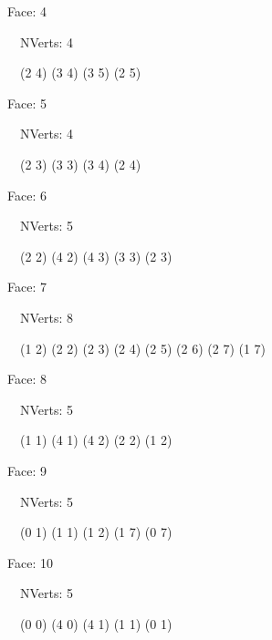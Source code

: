 \documentclass{article}
\begin{document}
    {\footnotesize

    Face: 4

    \   \    NVerts: 4

     \   \   (2 4) (3 4) (3 5) (2 5)}

    {\footnotesize

    Face: 5

    \   \    NVerts: 4

     \   \   (2 3) (3 3) (3 4) (2 4)}

    {\footnotesize

    Face: 6

    \   \    NVerts: 5

     \   \   (2 2) (4 2) (4 3) (3 3) (2 3)}

    {\footnotesize

    Face: 7

    \   \    NVerts: 8

     \   \   (1 2) (2 2) (2 3) (2 4) (2 5) (2 6) (2 7) (1 7)}

    {\footnotesize

    Face: 8

    \   \    NVerts: 5

     \   \   (1 1) (4 1) (4 2) (2 2) (1 2)}

    {\footnotesize

    Face: 9

    \   \    NVerts: 5

     \   \   (0 1) (1 1) (1 2) (1 7) (0 7)}

    {\footnotesize

    Face: 10

    \   \    NVerts: 5

     \   \   (0 0) (4 0) (4 1) (1 1) (0 1)}


     \newpage
\end{document}
